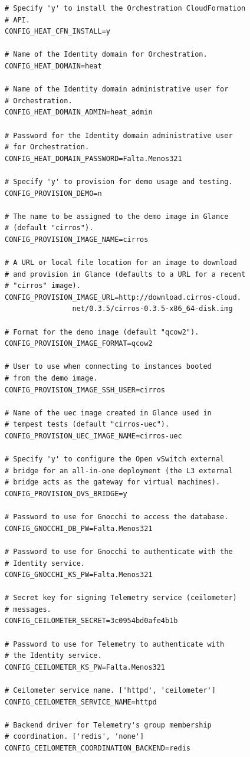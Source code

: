 \documentclass[12pt,a4paper,oneside]{book}
\begin{document}
\begin{lstlisting}[style=codigobase,  caption= answers.cfg]
# Specify 'y' to install the Orchestration CloudFormation 
# API.
CONFIG_HEAT_CFN_INSTALL=y

# Name of the Identity domain for Orchestration.
CONFIG_HEAT_DOMAIN=heat

# Name of the Identity domain administrative user for 
# Orchestration.
CONFIG_HEAT_DOMAIN_ADMIN=heat_admin

# Password for the Identity domain administrative user 
# for Orchestration.
CONFIG_HEAT_DOMAIN_PASSWORD=Falta.Menos321

# Specify 'y' to provision for demo usage and testing.
CONFIG_PROVISION_DEMO=n

# The name to be assigned to the demo image in Glance 
# (default "cirros").
CONFIG_PROVISION_IMAGE_NAME=cirros

# A URL or local file location for an image to download
# and provision in Glance (defaults to a URL for a recent
# "cirros" image).
CONFIG_PROVISION_IMAGE_URL=http://download.cirros-cloud.
                net/0.3.5/cirros-0.3.5-x86_64-disk.img

# Format for the demo image (default "qcow2").
CONFIG_PROVISION_IMAGE_FORMAT=qcow2

# User to use when connecting to instances booted 
# from the demo image.
CONFIG_PROVISION_IMAGE_SSH_USER=cirros

# Name of the uec image created in Glance used in 
# tempest tests (default "cirros-uec").
CONFIG_PROVISION_UEC_IMAGE_NAME=cirros-uec

# Specify 'y' to configure the Open vSwitch external 
# bridge for an all-in-one deployment (the L3 external 
# bridge acts as the gateway for virtual machines).
CONFIG_PROVISION_OVS_BRIDGE=y

# Password to use for Gnocchi to access the database.
CONFIG_GNOCCHI_DB_PW=Falta.Menos321

# Password to use for Gnocchi to authenticate with the 
# Identity service.
CONFIG_GNOCCHI_KS_PW=Falta.Menos321

# Secret key for signing Telemetry service (ceilometer)
# messages.
CONFIG_CEILOMETER_SECRET=3c0954bd0afe4b1b

# Password to use for Telemetry to authenticate with 
# the Identity service.
CONFIG_CEILOMETER_KS_PW=Falta.Menos321

# Ceilometer service name. ['httpd', 'ceilometer']
CONFIG_CEILOMETER_SERVICE_NAME=httpd

# Backend driver for Telemetry's group membership 
# coordination. ['redis', 'none']
CONFIG_CEILOMETER_COORDINATION_BACKEND=redis


\end{lstlisting}
\end{document}
